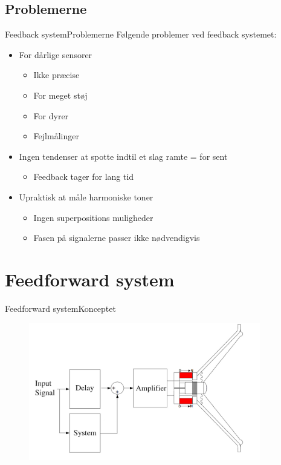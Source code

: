 \documentclass[10pt,aspectratio=169]{beamer}
\begin{document}
\subsection{Problemerne}
\begin{frame}{Feedback system}{Problemerne}
Følgende problemer ved feedback systemet:
\begin{itemize}
\item For dårlige sensorer
\begin{itemize}
\item Ikke præcise
\item For meget støj
\item For dyrer 
\item Fejlmålinger
\end{itemize}
\item Ingen tendenser at spotte indtil et slag ramte = for sent
\begin{itemize}
\item Feedback tager for lang tid
\end{itemize}
\item Upraktisk at måle harmoniske toner 
\begin{itemize}
\item Ingen superpositions muligheder
\item Fasen på signalerne passer ikke nødvendigvis
\end{itemize}
\end{itemize}
\end{frame}


\section{Feedforward system}

\begin{frame}{Feedforward system}{Konceptet}

\begin{figure}
\centering
\includegraphics[width=0.9\textwidth]{Feedforward_Acc2}
\end{figure}

\end{frame}
\end{document}
